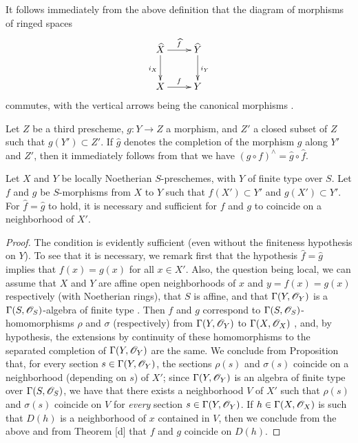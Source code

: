 \begin{env}[10.9.2]
\label{1.10.9.2}
It follows immediately from the above definition that the diagram of morphisms of ringed spaces
\[
  \xymatrix{
    \widehat{X}\ar[r]^{\widehat{f}}\ar[d]_{i_X} &
    \widehat{Y}\ar[d]^{i_Y}\\
    X\ar[r]^f &
    Y
  }
\]
commutes, with the vertical arrows being the canonical morphisms .
\end{env}

\begin{env}[10.9.3]
\label{1.10.9.3}
Let $Z$ be a third prescheme, $g:Y\to Z$ a morphism, and $Z'$ a closed subset of $Z$ such that $g(Y')\subset Z'$.
If $\widehat{g}$ denotes the completion of the morphism $g$ along $Y'$ and $Z'$, then it immediately follows from  that we have $(g\circ f)^\wedge=\widehat{g}\circ\widehat{f}$.
\end{env}

\begin{proposition}[10.9.4]
\label{1.10.9.4}
Let $X$ and $Y$ be locally Noetherian $S$-preschemes, with $Y$ of finite type over $S$.
Let $f$ and $g$ be $S$-morphisms from $X$ to $Y$ such that $f(X')\subset Y'$ and $g(X')\subset Y'$.
For $\widehat{f}=\widehat{g}$ to hold, it is necessary and sufficient for $f$ and $g$ to coincide on a neighborhood of $X'$.
\end{proposition}

\begin{proof}
\label{proof-1.10.9.4}
The condition is evidently sufficient (even without the finiteness hypothesis on $Y$).
To see that it is necessary, we remark first that the hypothesis $\widehat{f}=\widehat{g}$ implies that $f(x)=g(x)$ for all $x\in X'$.
Also, the question being local, we can assume that $X$ and $Y$ are affine open neighborhoods of $x$ and $y=f(x)=g(x)$ respectively (with Noetherian rings), that $S$ is affine, and that $\Gamma(Y,\mathscr{O}_Y)$ is a $\Gamma(S,\mathscr{O}_S)$-algebra of finite type .
Then $f$ and $g$ correspond to $\Gamma(S,\mathscr{O}_S)$-homomorphisms $\rho$ and $\sigma$ (respectively) from $\Gamma(Y,\mathscr{O}_Y)$ to $\Gamma(X,\mathscr{O}_X)$ , and, by hypothesis, the extensions by continuity of these homomorphisms to the separated completion of $\Gamma(Y,\mathscr{O}_Y)$ are the same.
We conclude from Proposition  that, for every section $s\in\Gamma(Y,\mathscr{O}_Y)$, the sections $\rho(s)$ and $\sigma(s)$ coincide on a neighborhood (depending on $s$) of $X'$; since $\Gamma(Y,\mathscr{O}_Y)$ is an algebra of finite type over $\Gamma(S,\mathscr{O}_S)$, we have that there exists a neighborhood $V$ of $X'$ such that $\rho(s)$ and $\sigma(s)$ coincide on $V$ for \emph{every} section $s\in\Gamma(Y,\mathscr{O}_Y)$.
If $h\in\Gamma(X,\mathscr{O}_X)$ is such that $D(h)$ is a neighborhood of $x$ contained in $V$, then we conclude from the above and from Theorem [d] that $f$ and $g$ coincide on $D(h)$.
\end{proof}

